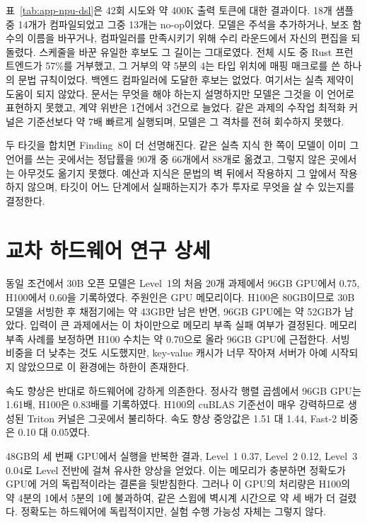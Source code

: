 표~\ref{tab:app-npu-dsl}은 42회 시도와 약 400K 출력 토큰에 대한 결과이다. 18개 샘플 중 14개가
컴파일되었고 그중 13개는 no-op이었다. 모델은 주석을 추가하거나, 보조 함수의 이름을 바꾸거나, 컴파일러를
만족시키기 위해 수리 라운드에서 자신의 편집을 되돌렸다. 스케줄을 바꾼 유일한 후보도 그 길이는 그대로였다.
전체 시도 중 Rust 프런트엔드가 57\%를 거부했고, 그 거부의 약 5분의 4는 타입 위치에 매핑 매크로를 쓴
하나의 문법 규칙이었다. 백엔드 컴파일러에 도달한 후보는 없었다. 여기서는 실측 제약이 도움이 되지 않았다.
문서는 무엇을 해야 하는지 설명하지만 모델은 그것을 이 언어로 표현하지 못했고, 계약 위반은 1건에서 3건으로
늘었다. 같은 과제의 수작업 최적화 커널은 기준선보다 약 7배 빠르게 실행되며, 모델은 그 격차를 전혀
회수하지 못했다.

두 타깃을 합치면 Finding~8이 더 선명해진다. 같은 실측 지식 한 쪽이 모델이 이미 그 언어를 쓰는 곳에서는
정답률을 90개 중 66개에서 88개로 옮겼고, 그렇지 않은 곳에서는 아무것도 옮기지 못했다. 예산과 지식은 문법의
벽 뒤에서 작용하지 그 앞에서 작용하지 않으며, 타깃이 어느 단계에서 실패하는지가 추가 투자로 무엇을 살 수
있는지를 결정한다.

\section{교차 하드웨어 연구 상세}

동일 조건에서 30B 오픈 모델은 Level~1의 처음 20개 과제에서 96GB GPU에서 0.75, H100에서 0.60을
기록하였다. 주원인은 GPU 메모리이다. H100은 80GB이므로 30B 모델을 서빙한 후 채점기에는 약 43GB만
남은 반면, 96GB GPU에는 약 52GB가 남았다. 입력이 큰 과제에서는 이 차이만으로 메모리 부족 실패
여부가 결정된다. 메모리 부족 사례를 보정하면 H100 수치는 약 0.70으로 올라 96GB GPU에 근접한다.
서빙 비중을 더 낮추는 것도 시도했지만, key-value 캐시가 너무 작아져 서버가 아예 시작되지 않았으므로
이 환경에는 하한이 존재한다.

속도 향상은 반대로 하드웨어에 강하게 의존한다. 정사각 행렬 곱셈에서 96GB GPU는 1.61배, H100은
0.83배를 기록하였다. H100의 cuBLAS 기준선이 매우 강력하므로 생성된 Triton 커널은 그곳에서 불리하다.
속도 향상 중앙값은 1.51 대 1.44, Fast-2 비중은 0.10 대 0.05였다.

48GB의 세 번째 GPU에서 실행을 반복한 결과, Level~1 0.37, Level~2 0.12, Level~3 0.04로 Level 전반에
걸쳐 유사한 양상을 얻었다. 이는 메모리가 충분하면 정확도가 GPU에 거의 독립적이라는 결론을 뒷받침한다.
그러나 이 GPU의 처리량은 H100의 약 4분의 1에서 5분의 1에 불과하여, 같은 스윕에 벽시계 시간으로
약 세 배가 더 걸렸다. 정확도는 하드웨어에 독립적이지만, 실험 수행 가능성 자체는 그렇지 않다.

